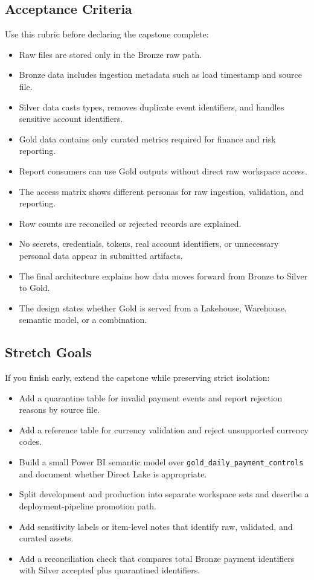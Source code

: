 \subsection*{Acceptance Criteria}
Use this rubric before declaring the capstone complete:
\begin{itemize}
    \item[\(\square\)] Raw files are stored only in the Bronze raw path.
    \item[\(\square\)] Bronze data includes ingestion metadata such as load timestamp and source file.
    \item[\(\square\)] Silver data casts types, removes duplicate event identifiers, and handles sensitive account identifiers.
    \item[\(\square\)] Gold data contains only curated metrics required for finance and risk reporting.
    \item[\(\square\)] Report consumers can use Gold outputs without direct raw workspace access.
    \item[\(\square\)] The access matrix shows different personas for raw ingestion, validation, and reporting.
    \item[\(\square\)] Row counts are reconciled or rejected records are explained.
    \item[\(\square\)] No secrets, credentials, tokens, real account identifiers, or unnecessary personal data appear in submitted artifacts.
    \item[\(\square\)] The final architecture explains how data moves forward from Bronze to Silver to Gold.
    \item[\(\square\)] The design states whether Gold is served from a Lakehouse, Warehouse, semantic model, or a combination.
\end{itemize}

\subsection*{Stretch Goals}
If you finish early, extend the capstone while preserving strict isolation:
\begin{itemize}
    \item Add a quarantine table for invalid payment events and report rejection reasons by source file.
    \item Add a reference table for currency validation and reject unsupported currency codes.
    \item Build a small Power BI semantic model over \texttt{gold\_daily\_payment\_controls} and document whether Direct Lake is appropriate.
    \item Split development and production into separate workspace sets and describe a deployment-pipeline promotion path.
    \item Add sensitivity labels or item-level notes that identify raw, validated, and curated assets.
    \item Add a reconciliation check that compares total Bronze payment identifiers with Silver accepted plus quarantined identifiers.
\end{itemize}
